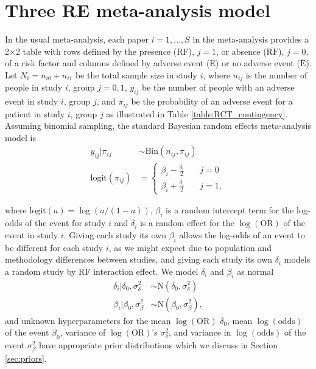 \documentclass[AMA,STIX1COL]{WileyNJD-v2}
\newcommand{\Ebar}{\overline{\mbox{E}}}
\newcommand{\RFbar}{\overline{\mbox{RF}}}
\begin{document}
\section{Three RE meta-analysis model} \label{sec:3REmodel}

In the usual meta-analysis, each paper $i = 1, \dots, S$ in the meta-analysis provides a 2$\times$2 table with rows defined by the presence (RF), $j = 1$, or absence ($\RFbar$), $j = 0$, of a risk factor and columns defined by adverse event (E) or no adverse event ($\Ebar$). Let $N_i = n_{i0} + n_{i1}$ be the total sample size in study $i$, where $n_{ij}$ is the number of people in study $i$, group $j=0,1$, $y_{ij}$ be the number of people with an adverse event in study $i$, group $j$, and $\pi_{ij}$ be the probability of an adverse event for a patient in study $i$, group $j$ as illustrated in Table \ref{table:RCT_contingency}. Assuming binomial sampling, the standard Bayesian random effects meta-analysis model is 
\begin{align}
y_{ij} \vert \pi_{ij} & \sim \mbox{Bin}(n_{ij}, \pi_{ij})  \label{eq:likelihood}\\
\mbox{logit}(\pi_{ij}) & =  \left\{
                  \begin{array}{ll}
                    \beta_{i} - \frac{\delta_i}{2} & \quad j=0 \\ 
                    \beta_{i} + \frac{\delta_i}{2} & \quad j=1,
                  \end{array}
                \right. \label{eq:logit}
\end{align}

\noindent where $\mbox{logit}(a) = \log(a/(1-a))$, $\beta_i$ is a random intercept term for the log-odds of the event for study $i$ and $\delta_i$ is a random effect for the $\log(\mbox{OR})$ of the event in study $i$. Giving each study its own $\beta_i$ allows the log-odds of an event to be different for each study $i$, as we might expect due to population and methodology differences between studies, and giving each study its own $\delta_i$ models a random study by RF interaction effect. We model $\delta_i$ and $\beta_i$ as normal
\begin{align}
\delta_i \vert \delta_0, \sigma^2_{\delta} & \sim \mbox{N}(\delta_0, \sigma^2_{\delta}) \label{eq:deltai} \\
\beta_i \vert \beta_0, \sigma^2_{\beta} & \sim \mbox{N}(\beta_0, \sigma^2_{\beta}), \label{eq:betai}
\end{align}
\noindent and unknown hyperparameters for the mean $\log(\mbox{OR})$ $\delta_0$, mean $\log(\mbox{odds})$ of the event $\beta_0$,  variance of $\log(\mbox{OR})$'s $\sigma^2_{\delta}$, and variance in $\log(\mbox{odds})$ of the event $\sigma^2_{\beta}$ have appropriate prior distributions which we discuss in Section \ref{sec:priors}. 
\end{document}
